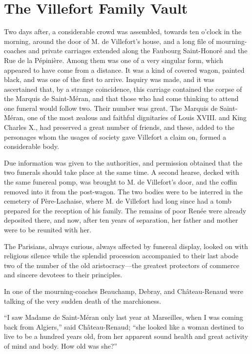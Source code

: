 \chapter{The Villefort Family Vault}

Two days after, a considerable crowd was assembled, towards ten o’clock
in the morning, around the door of M. de Villefort’s house, and a long
file of mourning-coaches and private carriages extended along the
Faubourg Saint-Honoré and the Rue de la Pépinière. Among them was one
of a very singular form, which appeared to have come from a distance.
It was a kind of covered wagon, painted black, and was one of the first
to arrive. Inquiry was made, and it was ascertained that, by a strange
coincidence, this carriage contained the corpse of the Marquis de
Saint-Méran, and that those who had come thinking to attend one funeral
would follow two. Their number was great. The Marquis de Saint-Méran,
one of the most zealous and faithful dignitaries of Louis XVIII. and
King Charles X., had preserved a great number of friends, and these,
added to the personages whom the usages of society gave Villefort a
claim on, formed a considerable body.

Due information was given to the authorities, and permission obtained
that the two funerals should take place at the same time. A second
hearse, decked with the same funereal pomp, was brought to M. de
Villefort’s door, and the coffin removed into it from the post-wagon.
The two bodies were to be interred in the cemetery of Père-Lachaise,
where M. de Villefort had long since had a tomb prepared for the
reception of his family. The remains of poor Renée were already
deposited there, and now, after ten years of separation, her father and
mother were to be reunited with her.

The Parisians, always curious, always affected by funereal display,
looked on with religious silence while the splendid procession
accompanied to their last abode two of the number of the old
aristocracy—the greatest protectors of commerce and sincere devotees to
their principles.

In one of the mourning-coaches Beauchamp, Debray, and Château-Renaud
were talking of the very sudden death of the marchioness.

“I saw Madame de Saint-Méran only last year at Marseilles, when I was
coming back from Algiers,” said Château-Renaud; “she looked like a
woman destined to live to be a hundred years old, from her apparent
sound health and great activity of mind and body. How old was she?”

